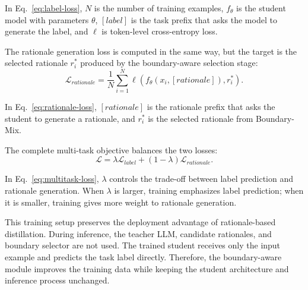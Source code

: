 In Eq.~\eqref{eq:label-loss}, $N$ is the number of training examples, $f_\theta$ is the student model with parameters $\theta$, $[label]$ is the task prefix that asks the model to generate the label, and $\ell$ is token-level cross-entropy loss.

The rationale generation loss is computed in the same way, but the target is the selected rationale $r_i^*$ produced by the boundary-aware selection stage:
\begin{equation}
    \mathcal{L}_{rationale}
    = \frac{1}{N}\sum_{i=1}^{N}
    \ell(f_\theta(x_i, [rationale]), r_i^*).
    \label{eq:rationale-loss}
\end{equation}

In Eq.~\eqref{eq:rationale-loss}, $[rationale]$ is the rationale prefix that asks the student to generate a rationale, and $r_i^*$ is the selected rationale from Boundary-Mix.

The complete multi-task objective balances the two losses:
\begin{equation}
    \mathcal{L}
    = \lambda \mathcal{L}_{label}
    + (1-\lambda)\mathcal{L}_{rationale}.
    \label{eq:multitask-loss}
\end{equation}

In Eq.~\eqref{eq:multitask-loss}, $\lambda$ controls the trade-off between label prediction and rationale generation. When $\lambda$ is larger, training emphasizes label prediction; when it is smaller, training gives more weight to rationale generation.

This training setup preserves the deployment advantage of rationale-based distillation. During inference, the teacher LLM, candidate rationales, and boundary selector are not used. The trained student receives only the input example and predicts the task label directly. Therefore, the boundary-aware module improves the training data while keeping the student architecture and inference process unchanged.
